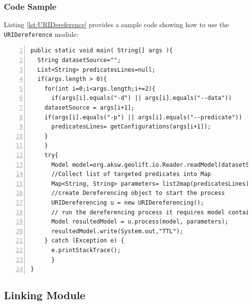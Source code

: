 \documentclass[a4paper,twoside,bibtotoc,abstracton,12pt,BCOR=15mm]{article}
\begin{document}
\subsubsection{Code Sample}
Listing \ref{lst:URIDereference} provides a sample code showing how to use the \texttt{URIDereference} module:\\

\begin{lstlisting}[label=lst:URIDereference, numbers=left, numberstyle=\tiny, caption = Code fragment to call the \texttt{URIDereferencing} class.]
public static void main( String[] args ){	
  String datasetSource="";
  List<String> predicatesLines=null;
  if(args.length > 0){
    for(int i=0;i<args.length;i+=2){
      if(args[i].equals("-d") || args[i].equals("--data"))
	datasetSource = args[i+1];
	if(args[i].equals("-p") || args[i].equals("--predicate"))
	  predicatesLines= getConfigurations(args[i+1]);
	}
    }
    try{ 
      Model model=org.aksw.geolift.io.Reader.readModel(datasetSource);//First parameter: model is loaded with dataset from specified file/endpoint
      //Collect list of targeted predicates into Map
      Map<String, String> parameters= list2map(predicatesLines);
      //create Dereferencing object to start the process
      URIDereferencing u = new URIDereferencing();
      // run the dereferencing process it requires model contains the dataset and list of targeted predicates to enrich the model
      Model resultedModel = u.process(model, parameters);
      resultedModel.write(System.out,"TTL");
    } catch (Exception e) {
      e.printStackTrace();
      }
}

\end{lstlisting}


\subsection{Linking Module}
\end{document}
